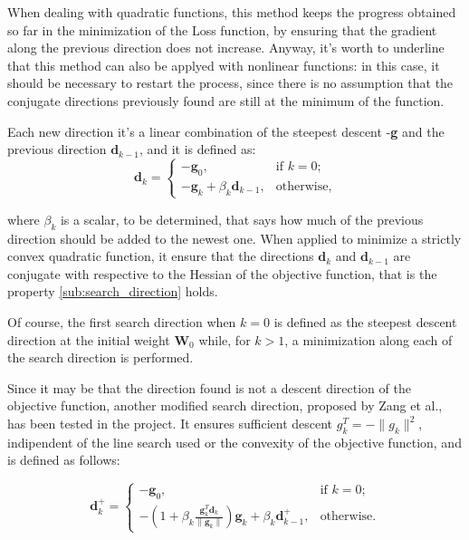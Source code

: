 			When dealing with quadratic functions, this method keeps the progress obtained so far in the minimization of the Loss function, by ensuring that the gradient along the previous direction does not increase.
			Anyway, it's worth to underline that this method can also be applyed with nonlinear functions: in this case, it should be necessary to restart the process, since there is no assumption that the conjugate directions previously found are still at the minimum of the function.

			Each new direction it's a linear combination of the steepest descent -\textbf{g} and the previous direction $\textbf{d}_{k-1}$, and it is defined as:
			\begin{equation}
			\label{dir}
			  \textbf{d}_k=\begin{cases}
			    -\textbf{g}_0, & \text{if $k=0$};\\
			    -\textbf{g}_k + \beta_k\textbf{d}_{k-1}, & \text{otherwise,}
			  \end{cases}
			\end{equation}

			where $\beta_k$ is a scalar, to be determined, that says how much of the previous direction should be added to the newest one. When applied to minimize a strictly convex quadratic function, it ensure that the directions $\textbf{d}_{k}$ and $\textbf{d}_{k-1}$ are conjugate with respective to the Hessian of the objective function, that is the property \ref{sub:search_direction} holds.

			Of course, the first search direction when $k = 0$ is defined as the steepest descent direction at the initial weight $\textbf{W}_0$ while, for $k > 1$, a minimization along each of the search direction is performed.

			Since it may be that the direction found is not a descent direction of the objective function, another modified search direction, proposed by Zang et al.\cite{L-2006}, has been tested in the project. It ensures sufficient descent $g_k^T = -\|g_k\|^2$, indipendent of the line search used or the convexity of the objective function, and is defined as follows:

			\begin{equation}
			\label{mod_dir}
				\textbf{d}_k^+=\begin{cases}
			    -\textbf{g}_0, & \text{if $k=0$};\\
			    -(1 + \beta_k\frac{\textbf{g}_k^T\textbf{d}_{k}}{\|\textbf{g}_k\|})\textbf{g}_k + \beta_k\textbf{d}_{k-1}^+, & \text{otherwise.}
			  \end{cases}
			\end{equation}



